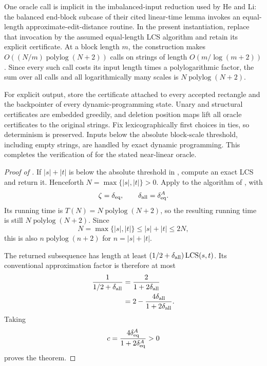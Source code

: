 \documentclass[11pt]{article}
\theoremstyle{remark}
\newcommand{\LCS}{\operatorname{LCS}}
\newcommand{\polylog}{\operatorname{polylog}}
\begin{document}
One oracle call is implicit in the imbalanced-input reduction used by
He and Li: the balanced end-block subcase of their cited linear-time
lemma invokes an equal-length approximate-edit-distance routine.  In
the present instantiation, replace that invocation by the assumed
equal-length LCS algorithm and retain its explicit certificate.  At a
block length $m$, the construction makes
$O((N/m)\polylog(N+2))$ calls on strings of length
$O(m/\log(m+2))$.  Since every such call costs its input length times
a polylogarithmic factor, the sum over all calls and all logarithmically
many scales is $N\polylog(N+2)$.

For explicit output, store the certificate attached to every accepted
rectangle and the backpointer of every dynamic-programming state.
Unary and structural certificates are embedded greedily, and deletion
position maps lift all oracle certificates to the original strings.
Fix lexicographically first choices in ties, so determinism is
preserved.  Inputs below the absolute block-scale threshold, including
empty strings, are handled by exact dynamic programming.  This
completes the verification of  for the stated
near-linear oracle.

\begin{proof}[Proof of ]
If $|s|+|t|$ is below the absolute threshold in , compute an
exact LCS and return it.  Henceforth $N=\max\{|s|,|t|\}>0$.
Apply  to the algorithm of
, with
\[
 \zeta=\delta_{\rm eq},\qquad
 \delta_{\rm all}=\delta_{\rm eq}^{A}.
\]
Its running time is $T(N)=N\polylog(N+2)$, so the resulting running
time is still $N\polylog(N+2)$.  Since
\[
 N=\max\{|s|,|t|\}\le |s|+|t|\le2N,
\]
this is also $n\polylog(n+2)$ for $n=|s|+|t|$.

The returned subsequence has length at least
$(1/2+\delta_{\rm all})\LCS(s,t)$.  Its conventional approximation
factor is therefore at most
\begin{align*}
 \frac1{1/2+\delta_{\rm all}}
 &=\frac2{1+2\delta_{\rm all}}\\
 &=2-\frac{4\delta_{\rm all}}{1+2\delta_{\rm all}}.
\end{align*}
Taking
\[
 c=\frac{4\delta_{\rm eq}^{A}}
          {1+2\delta_{\rm eq}^{A}}>0
\]
proves the theorem.
\end{proof}

{\small


}
\end{document}
